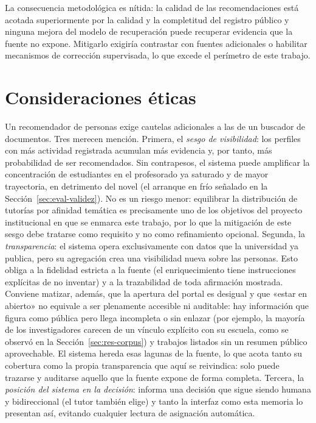 La consecuencia metodológica es nítida: la calidad de las recomendaciones está acotada superiormente por la calidad y la completitud del registro público y ninguna mejora del modelo de recuperación puede recuperar evidencia que la fuente no expone.
Mitigarlo exigiría contrastar con fuentes adicionales o habilitar mecanismos de corrección supervisada, lo que excede el perímetro de este trabajo.

\section{Consideraciones éticas}
\label{sec:disc-etica}

Un recomendador de personas exige cautelas adicionales a las de un buscador de documentos.
Tres merecen mención.
Primera, el \emph{sesgo de visibilidad}: los perfiles con más actividad registrada acumulan más evidencia y, por tanto, más probabilidad de ser recomendados. Sin contrapesos, el sistema puede amplificar la concentración de estudiantes en el profesorado ya saturado y de mayor trayectoria, en detrimento del novel (el arranque en frío señalado en la Sección~\ref{sec:eval-validez}).
No es un riesgo menor: equilibrar la distribución de tutorías por afinidad temática es precisamente uno de los objetivos del proyecto institucional en que se enmarca este trabajo, por lo que la mitigación de este sesgo debe tratarse como requisito y no como refinamiento opcional.
Segunda, la \emph{transparencia}: el sistema opera exclusivamente con datos que la universidad ya publica, pero su agregación crea una visibilidad nueva sobre las personas. Esto obliga a la fidelidad estricta a la fuente (el enriquecimiento tiene instrucciones explícitas de no inventar) y a la trazabilidad de toda afirmación mostrada.
Conviene matizar, además, que la apertura del portal es desigual y que «estar en abierto» no equivale a ser plenamente accesible ni auditable: hay información que figura como pública pero llega incompleta o sin enlazar (por ejemplo, la mayoría de los investigadores carecen de un vínculo explícito con su escuela, como se observó en la Sección~\ref{sec:res-corpus}) y trabajos listados sin un resumen público aprovechable.
El sistema hereda esas lagunas de la fuente, lo que acota tanto su cobertura como la propia transparencia que aquí se reivindica: solo puede trazarse y auditarse aquello que la fuente expone de forma completa.
Tercera, la \emph{posición del sistema en la decisión}: \proyecto informa una decisión que sigue siendo humana y bidireccional (el tutor también elige) y tanto la interfaz como esta memoria lo presentan así, evitando cualquier lectura de asignación automática.
